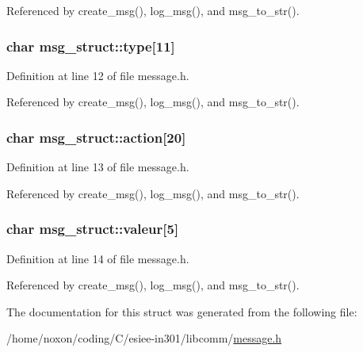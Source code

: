 Referenced by create\_\-msg(), log\_\-msg(), and msg\_\-to\_\-str().\hypertarget{structmsg__struct_b1bee85c89cf3c52f0a4343675f76038}{
\subsubsection{\setlength{\rightskip}{0pt plus 5cm}char {\bf msg\_\-struct::type}\mbox{[}11\mbox{]}}}
\label{structmsg__struct_b1bee85c89cf3c52f0a4343675f76038}




Definition at line 12 of file message.h.

Referenced by create\_\-msg(), log\_\-msg(), and msg\_\-to\_\-str().\hypertarget{structmsg__struct_6863e9ef8f00f38466c33643798b2652}{
\subsubsection{\setlength{\rightskip}{0pt plus 5cm}char {\bf msg\_\-struct::action}\mbox{[}20\mbox{]}}}
\label{structmsg__struct_6863e9ef8f00f38466c33643798b2652}




Definition at line 13 of file message.h.

Referenced by create\_\-msg(), log\_\-msg(), and msg\_\-to\_\-str().\hypertarget{structmsg__struct_388703005dfbdfb61b6c5eb72b25f535}{
\subsubsection{\setlength{\rightskip}{0pt plus 5cm}char {\bf msg\_\-struct::valeur}\mbox{[}5\mbox{]}}}
\label{structmsg__struct_388703005dfbdfb61b6c5eb72b25f535}




Definition at line 14 of file message.h.

Referenced by create\_\-msg(), log\_\-msg(), and msg\_\-to\_\-str().

The documentation for this struct was generated from the following file:\begin{CompactItemize}
\item 
/home/noxon/coding/C/esiee-in301/libcomm/\hyperlink{message_8h}{message.h}\end{CompactItemize}

